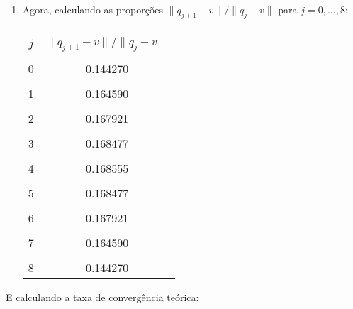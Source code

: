 \documentclass[a4paper,11pt]{article}
\begin{document}
\begin{enumerate}[label=\textbf{(\alph*)}]
            \item Agora, calculando as proporções $\|q_{j+1}-v\| / \|q_{j}-v\|$ para $j=0,...,8$:
            \begin{center}
                \begin{tabular}{ | c | c |} 
                    \hline
                    & \\ [-1em]
                    $j$ & $\|q_{j+1}-v\| / \|q_{j}-v\|$\\  [+.5em]
                    \hline\hline
                    & \\ [-1em]
                    0 & 0.144270\\ [+.5em]
                    \hline
                    & \\ [-1em]
                    1 & 0.164590\\ [+.5em]
                    \hline
                    &\\ [-1em]
                    2 & 0.167921\\ [+.5em]
                    \hline
                    & \\ [-1em]
                    3 & 0.168477\\ [+.5em]
                    \hline
                    & \\ [-1em]
                    4 & 0.168555 \\ [+.5em]
                    \hline
                    & \\ [-1em]
                    5 & 0.168477 \\ [+.5em]
                    \hline
                    & \\ [-1em]
                    6 & 0.167921\\ [+.5em]
                    \hline
                    & \\ [-1em]
                    7 & 0.164590\\ [+.5em]
                    \hline
                    &\\ [-1em]
                    8 & 0.144270\\ [+.5em]
                    \hline
                \end{tabular}
            \end{center}
        \end{enumerate}
        E calculando a taxa de convergência teórica:
\end{document}
